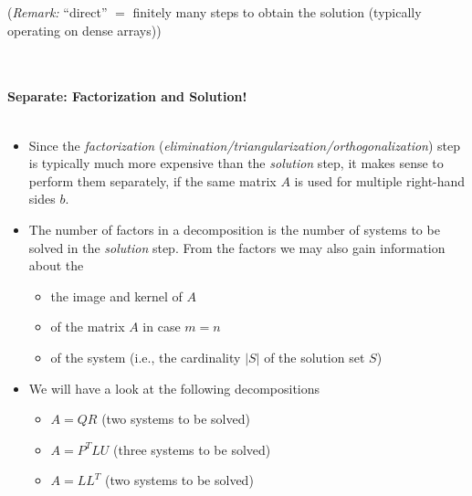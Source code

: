 \begin{frame}
{{\small (\textit{Remark:} ``direct'' $=$ finitely many steps to obtain the solution (typically operating on dense arrays))}\\~\\}
\end{frame}

\begin{frame}
	~\\		
	\textbf{Separate: Factorization and Solution!}\\
	~\\	
	\begin{itemize}
		\item Since the \textit{factorization} (\textit{elimination/triangularization/orthogonalization}) step is typically much more expensive than the \textit{solution} step, it makes sense to perform them separately, if the same matrix $A$ is used for multiple right-hand sides $b$.\vspace{0.5cm}
		\item The number of factors in a decomposition is the number of systems to be solved in the \textit{solution} step.\vspace{0.2cm}
		From the factors we may also gain information about the
		\begin{itemize} \normalsize
			\vspace{0.15cm}\item the image and kernel of $A$
			\vspace{0.15cm}\item {} of the matrix $A$ in case $m=n$ 
			\vspace{0.15cm}\item {} of the system (i.e., the cardinality $|S|$ of the solution set $S$)
		\end{itemize} \vspace{0.5cm}
		\item We will have a look at the following decompositions
		\begin{itemize} \normalsize
			\item $A = QR$ (two systems to be solved)
			\vspace{0.15cm}\item $A = P^TLU$ (three systems to be solved)
			\vspace{0.15cm}\item $A = LL^T$ (two systems to be solved)
		\end{itemize} 
	\end{itemize}
\end{frame}

